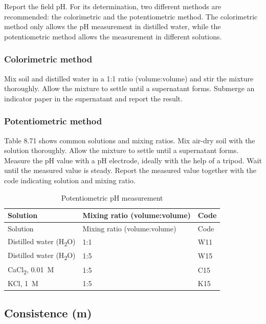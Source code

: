 \documentclass[
  letterpaper,
  DIV=11,
  numbers=noendperiod]{scrreprt}
\begin{document}
Report the field pH. For its determination, two different methods are
recommended: the colorimetric and the potentiometric method. The
colorimetric method only allows the pH measurement in distilled water,
while the potentiometric method allows the measurement in different
solutions.

\hypertarget{colorimetric-method}{%
\subsubsection{Colorimetric method}\label{colorimetric-method}}

Mix soil and distilled water in a 1:1 ratio (volume:volume) and stir the
mixture thoroughly. Allow the mixture to settle until a supernatant
forms. Submerge an indicator paper in the supernatant and report the
result.

\hypertarget{potentiometric-method}{%
\subsubsection{Potentiometric method}\label{potentiometric-method}}

Table 8.71 shows common solutions and mixing ratios. Mix air-dry soil
with the solution thoroughly. Allow the mixture to settle until a
supernatant forms. Measure the pH value with a pH electrode, ideally
with the help of a tripod. Wait until the measured value is steady.
Report the measured value together with the code indicating solution and
mixing ratio.

\begin{longtable}[]{@{}lll@{}}
\caption{Potentiometric pH measurement}\tabularnewline
\toprule()
Solution & Mixing ratio (volume:volume) & Code \\
\midrule()
\endfirsthead
\toprule()
Solution & Mixing ratio (volume:volume) & Code \\
\midrule()
\endhead
Distilled water (H\textsubscript{2}O) & 1:1 & W11 \\
Distilled water (H\textsubscript{2}O) & 1:5 & W15 \\
CaCl\textsubscript{2}, 0.01~M & 1:5 & C15 \\
KCl, 1~M & 1:5 & K15 \\
\bottomrule()
\end{longtable}

\hypertarget{consistence-m}{%
\subsection{Consistence (m)}\label{consistence-m}}
\end{document}
